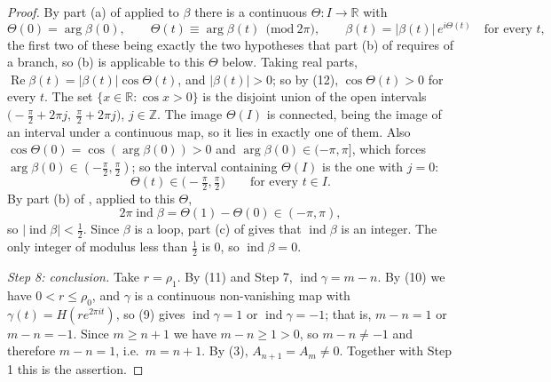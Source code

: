 \begin{proof}
By part (a) of  applied to $\beta$ there is a
continuous $\Theta\colon I\to\mathbb{R}$ with
\[
  \Theta(0)=\arg\beta(0),\qquad
  \Theta(t)\equiv\arg\beta(t)\ \ \bigl(\mathrm{mod}\ 2\pi\bigr),\qquad
  \beta(t)=|\beta(t)|\,e^{i\Theta(t)}\quad\text{for every }t ,
\]
the first two of these being exactly the two hypotheses that part (b) of
 requires of a branch, so (b) is applicable to this
$\Theta$ below.
Taking real parts, $\operatorname{Re}\beta(t)=|\beta(t)|\cos\Theta(t)$, and
$|\beta(t)|>0$; so by (12), $\cos\Theta(t)>0$ for every $t$.  The set
$\{x\in\mathbb{R}:\cos x>0\}$ is the disjoint union of the open intervals
$\bigl(-\tfrac\pi2+2\pi j,\ \tfrac\pi2+2\pi j\bigr)$, $j\in\mathbb{Z}$.  The
image $\Theta(I)$ is connected, being the image of an interval under a
continuous map, so it lies in exactly one of them.  Also
$\cos\Theta(0)=\cos(\arg\beta(0))>0$ and $\arg\beta(0)\in(-\pi,\pi]$, which
forces $\arg\beta(0)\in(-\tfrac\pi2,\tfrac\pi2)$; so the interval containing
$\Theta(I)$ is the one with $j=0$:
\[
  \Theta(t)\in\bigl(-\tfrac\pi2,\tfrac\pi2\bigr)\qquad\text{for every }t\in I .
\]
By part (b) of , applied to this $\Theta$,
\[
  2\pi\operatorname{ind}\beta=\Theta(1)-\Theta(0)\in(-\pi,\pi),
\]
so $|\operatorname{ind}\beta|<\tfrac12$.  Since $\beta$ is a loop, part (c) of
 gives that $\operatorname{ind}\beta$ is an integer.
The only integer of modulus less than $\tfrac12$ is $0$, so
$\operatorname{ind}\beta=0$.

\emph{Step 8: conclusion.}  Take $r=\rho_1$.  By (11) and Step 7,
$\operatorname{ind}\gamma=m-n$.  By (10) we have $0<r\le\rho_0$, and $\gamma$
is a continuous non-vanishing map with $\gamma(t)=H(re^{2\pi it})$, so (9)
gives $\operatorname{ind}\gamma=1$ or $\operatorname{ind}\gamma=-1$; that is,
$m-n=1$ or $m-n=-1$.  Since $m\ge n+1$ we have $m-n\ge1>0$, so $m-n\neq-1$ and
therefore $m-n=1$, i.e.\ $m=n+1$.  By (3), $A_{n+1}=A_m\neq0$.  Together with
Step 1 this is the assertion.
\end{proof}
